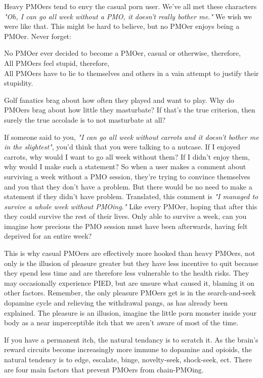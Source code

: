 \documentclass[easypeasy]{subfiles}
\begin{document}
Heavy PMOers tend to envy the casual porn user. We've all met these characters \textit{"Oh, I can go all week without a PMO, it doesn't really bother me."} We wish we were like that. This might be hard to believe, but no PMOer enjoys being a PMOer. Never forget:

  No PMOer ever decided to become a PMOer, casual or otherwise, therefore,\\
  All PMOers feel stupid, therefore,\\
  All PMOers have to lie to themselves and others in a vain attempt to justify their stupidity.

Golf fanatics brag about how often they played and want to play. Why do PMOers brag about how little they masturbate? If that's the true criterion, then surely the true accolade is to not masturbate at all?

If someone said to you, \textit{"I can go all week without carrots and it doesn't bother me in the slightest"}, you'd think that you were talking to a nutcase. If I enjoyed carrots, why would I want to go all week without them? If I didn't enjoy them, why would I make such a statement? So when a user makes a comment about surviving a week without a PMO session, they're trying to convince themselves and you that they don't have a problem. But there would be no need to make a statement if they didn't have problem. Translated, this comment is \textit{"I managed to survive a whole week without PMOing."} Like every PMOer, hoping that after this they could survive the rest of their lives. Only able to survive a week, can you imagine how precious the PMO session must have been afterwards, having felt deprived for an entire week?

This is why casual PMOers are effectively more hooked than heavy PMOers, not only is the illusion of pleasure greater but they have less incentive to quit because they spend less time and are therefore less vulnerable to the health risks. They may occasionally experience PIED, but are unsure what caused it, blaming it on other factors. Remember, the only pleasure PMOers get is in the search-and-seek dopamine cycle and relieving the withdrawal pangs, as has already been explained. The pleasure is an illusion, imagine the little porn monster inside your body as a near imperceptible itch that we aren't aware of most of the time.

If you have a permanent itch, the natural tendancy is to scratch it. As the brain's reward circuits become increasingly more immune to dopamine and opioids, the natural tendency is to edge, escalate, binge, novelty-seek, shock-seek, ect. There are four main factors that prevent PMOers from chain-PMOing.
\end{document}
